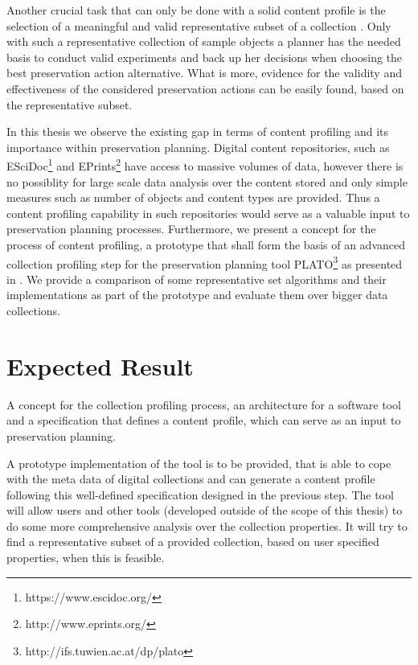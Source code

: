 \documentclass[a4paper,12pt]{scrartcl} %
\begin{document}
Another crucial task that can only be done with a solid content profile is the selection of a meaningful and valid representative subset of a collection \cite{Becker:2011:PDT:1998076.1998089, Pan05findingrepresentative}. Only with such a representative collection of sample objects a planner 
has the needed basis to conduct valid experiments and back up her decisions when choosing the best
preservation action alternative. What is more, evidence for the validity and effectiveness of the considered preservation actions can be easily found, based on the representative subset.

In this thesis we observe the existing gap in terms of content profiling and its importance within preservation
planning. Digital content repositories, such as ESciDoc\footnote{https://www.escidoc.org/} and EPrints\footnote{http://www.eprints.org/} have access to massive volumes of data, however there is no possiblity for large scale data analysis over the content stored and only simple measures such as number of objects and content types are provided. Thus a content profiling capability in such repositories would serve as a valuable input to preservation planning processes. Furthermore, we present a concept for the process of content profiling, a prototype that shall form the basis of an advanced collection profiling step for the preservation planning tool PLATO\footnote{http://ifs.tuwien.ac.at/dp/plato} as presented in \cite{Rauber:2009:dpchallenges}. We provide a comparison of some representative
set algorithms and their implementations as part of the prototype and evaluate them over bigger data collections.

\section*{Expected Result}
A concept for the collection profiling process, an architecture for a software tool and a specification that defines a content profile, which can serve as an input to preservation planning.

A prototype implementation of the tool is to be provided, that is able to cope with the meta data of digital collections and can generate a content profile following this well-defined specification designed in the previous step. The tool will allow users and other tools (developed outside of the scope of this thesis) to do some more comprehensive analysis over the collection properties. It will try to find a representative subset of a provided collection, based on user specified properties, when this is feasible.
\end{document}

